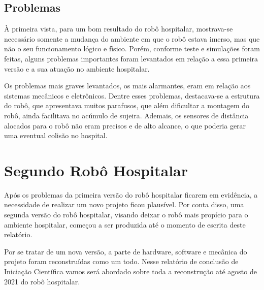 \documentclass[../delivery_hospital_report.tex]{subfiles}
\begin{document}
\subsection{Problemas}

À primeira vista, para um bom resultado do robô hospitalar, mostrava-se necessário somente a mudança do ambiente em que o robô estava imerso, mas que não o seu funcionamento lógico e físico. Porém, conforme teste e simulações foram feitas, alguns problemas importantes foram levantados em relação a essa primeira versão e a sua atuação no ambiente hospitalar.

Os problemas mais graves levantados, os mais alarmantes, eram em relação aos sistemas mecânicos e eletrônicos. Dentre esses problemas, destacava-se a estrutura do robô, que apresentava muitos parafusos, que além dificultar a montagem do robô, ainda facilitava no acúmulo de sujeira. Ademais, os sensores de distância alocados para o robô não eram precisos e de alto alcance, o que poderia gerar uma eventual colisão no hospital.

\section{Segundo Robô Hospitalar}

Após os problemas da primeira versão do robô hospitalar ficarem em evidência, a necessidade de realizar um novo projeto ficou plausível. Por conta disso, uma segunda versão do robô hospitalar, visando deixar o robô mais propício para o ambiente hospitalar, começou a ser produzida até o momento de escrita deste relatório. 

Por se tratar de um nova versão, a parte de hardware, software e mecânica do projeto foram reconstruídas como um todo. Nesse relatório de conclusão de Iniciação Científica vamos será abordado sobre toda a reconstrução até agosto de 2021 do robô hospitalar.
\end{document}
